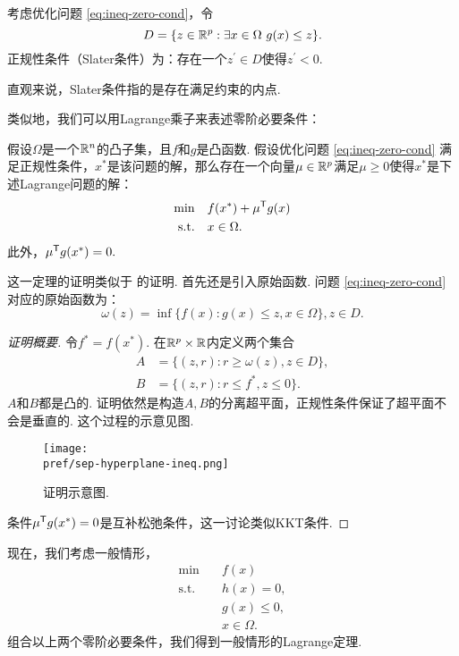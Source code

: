 \begin{definition}[Slater条件]
考虑优化问题 \eqref{eq:ineq-zero-cond}，令
\[D=\{z\in \mathbb{R}^p:\exists x\in\Omega\ {g(x)\le z}\}.\]
正规性条件（Slater条件）为：存在一个$z^\prime\in D$使得$z^\prime<0$. 
\end{definition}
直观来说，Slater条件指的是存在满足约束的内点.

类似地，我们可以用Lagrange乘子来表述零阶必要条件：
\begin{theorem}\label{thm:ineq-zero-cond}
假设$\Omega$是一个$\mathbb{R}^n$的凸子集，且$f$和${g}$是凸函数. 假设优化问题 \eqref{eq:ineq-zero-cond} 满足正规性条件，${x^\ast}$是该问题的解，那么存在一个向量${\mu}\in \mathbb{R}^p$满足$\mu\ge 0$使得${x^\ast}$是下述Lagrange问题的解：
\begin{align*}
\min\quad &f({x^\ast})+\mu^{\mathsf{T}} g(x)\\
\text{s.t.}\quad& x\in\Omega.
\end{align*}
此外，${\mu^{\mathsf{T}} g(x^\ast)}=0.$
\end{theorem}

这一定理的证明类似于 的证明. 首先还是引入原始函数. 问题 \eqref{eq:ineq-zero-cond} 对应的原始函数为：
    $$\omega({z})=\inf\{f({x}):g(x)\le{z},x\in\Omega\},z\in D.$$


\begin{proof}[证明概要]
令$f^\ast=f({x^\ast})$. 在$\mathbb{R}^{p}\times\mathbb{R}$内定义两个集合
\begin{align*}
    A&=\{(z,r):r\ge \omega(z), z\in D\},\\
    B&=\{(z,r):r\le f^\ast, z\leq 0\}.
\end{align*}
$A$和$B$都是凸的. 证明依然是构造$A,B$的分离超平面，正规性条件保证了超平面不会是垂直的. 这个过程的示意见图.
\begin{figure}
    \centering
    \texttt{[image: \\pref/sep-hyperplane-ineq.png]}
    \caption{证明示意图. }
    \label{fig:sep-hyperplane-ineq}
\end{figure}

条件$\mu^{\mathsf{T}} g(x^\ast)=0$是互补松弛条件，这一讨论类似KKT条件. 
\end{proof}

现在，我们考虑一般情形，
    \begin{equation}
          \begin{aligned}
        \min\quad & f({x}) \\
        \text{s.t.}\quad& {h(x)=0}, \\
        &g(x)\leq 0, \\
        &{x}\in\Omega.
        \end{aligned}\label{eq:mix-zero-cond}
    \end{equation}
组合以上两个零阶必要条件，我们得到一般情形的Lagrange定理.


